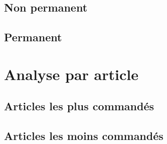 \documentclass{beamer}
\begin{document}
    \subsection{Non permanent}

    \begin{frame}
    \end{frame}

    \subsection{Permanent}

    \begin{frame}
    \end{frame}

    \section{Analyse par article}
    \subsection{Articles les plus commandés}

    \begin{frame}
    \end{frame}

    \subsection{Articles les moins commandés}

    \begin{frame}
    \end{frame}
\end{document}
